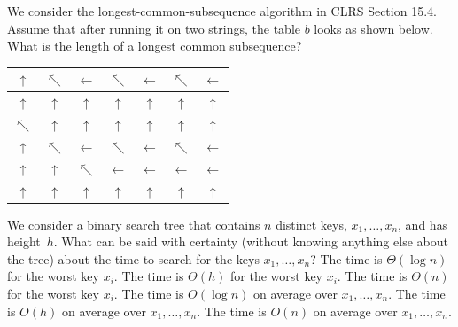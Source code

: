 We consider the longest-common-subsequence algorithm in CLRS Section 15.4.
Assume that after running it on two strings, the table $b$ looks as shown below.
What is the length of a longest common subsequence?
\begin{center}
\begin{tabular}{|c|c|c|c|c|c|c|}
    \hline
    $\uparrow$ & $\nwarrow$ & $\leftarrow$ & $\nwarrow$ & $\leftarrow$ & $\nwarrow$ & $\leftarrow$ \\
    \hline
    $\uparrow$ & $\uparrow$ & $\uparrow$ & $\uparrow$ & $\uparrow$ & $\uparrow$ & $\uparrow$ \\
    \hline
    $\nwarrow$ & $\uparrow$ & $\uparrow$ & $\uparrow$ & $\uparrow$ & $\uparrow$ & $\uparrow$ \\
    \hline
    $\uparrow$ & $\nwarrow$ & $\leftarrow$ & $\nwarrow$ & $\leftarrow$ & $\nwarrow$ & $\leftarrow$ \\
    \hline
    $\uparrow$ & $\uparrow$ & $\nwarrow$ & $\leftarrow$ & $\leftarrow$ & $\leftarrow$ & $\leftarrow$ \\
    \hline
    $\uparrow$ & $\uparrow$ & $\uparrow$ & $\uparrow$ & $\uparrow$ & $\uparrow$ & $\uparrow$ \\
    \hline
\end{tabular}
\end{center}
\oneanswer
\optionsstart
{}
\correct
{}
\optionsend
{}


We consider a binary search tree that contains $n$ distinct keys, $x_1,\dots,x_n$, and has height~$h$.
What can be said with certainty (without knowing anything else about the tree) about the time to search for the keys $x_1,\dots,x_n$?
\multipleanswers
\optionsstart
\answer The time is $\Theta(\log n)$ for the worst key $x_i$.
\answer The time is $\Theta(h)$ for the worst key $x_i$. \correct
\answer The time is $\Theta(n)$  for the worst key $x_i$.
\answer The time is $O(\log n)$ on average over $x_1,\dots,x_n$.
\answer The time is $O(h)$ on average over $x_1,\dots,x_n$. \correct
\answer The time is $O(n)$ on average over $x_1,\dots,x_n$. \correct
\optionsend
{}


